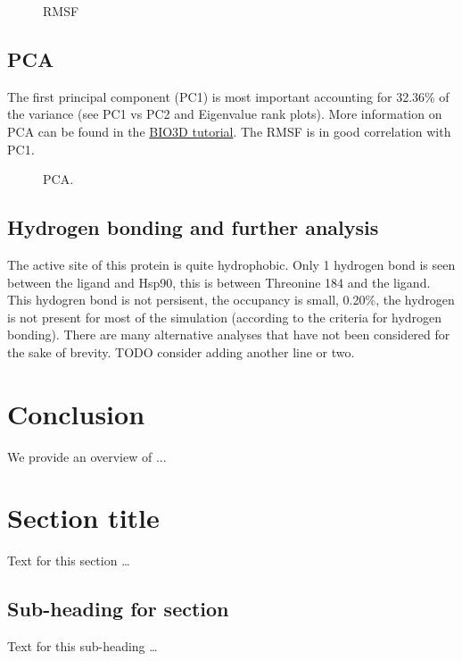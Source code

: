 \documentclass[twocolumn]{bmcart}%
\def\texttt{[image: ]}
\begin{document}
\begin{figure}[h!]
  \caption{
      RMSF}
\label{fig:rmsf}
      \end{figure}

\subsection*{PCA}

The first principal component (PC1) is most important accounting for
32.36\% of the variance (see PC1 vs PC2 and Eigenvalue rank plots). More
information on PCA can be found in the
\href{http://thegrantlab.org/bio3d/tutorials/trajectory-analysis}{BIO3D
tutorial}. The RMSF is in good correlation with PC1.

\begin{figure}[h!]
  \caption{
      PCA.}
\label{fig:rmsdligand}
      \end{figure}

\subsection*{Hydrogen bonding and further analysis}
The active site of this protein is quite hydrophobic. Only 1 hydrogen
bond is seen between the ligand and Hsp90, this is between Threonine 184
and the ligand. This hydogren bond is not persisent, the occupancy is
small, 0.20\%, the hydrogen is not present for most of the simulation
(according to the criteria for hydrogen bonding).
There are many alternative analyses that have not been considered for the sake of brevity. TODO consider adding another line or two.


\hypertarget{conclusion}{%
\section*{Conclusion}\label{conclusion}}

We provide an overview of ...



\section*{Section title}
Text for this section \ldots
\subsection*{Sub-heading for section}
Text for this sub-heading \ldots
\end{document}
